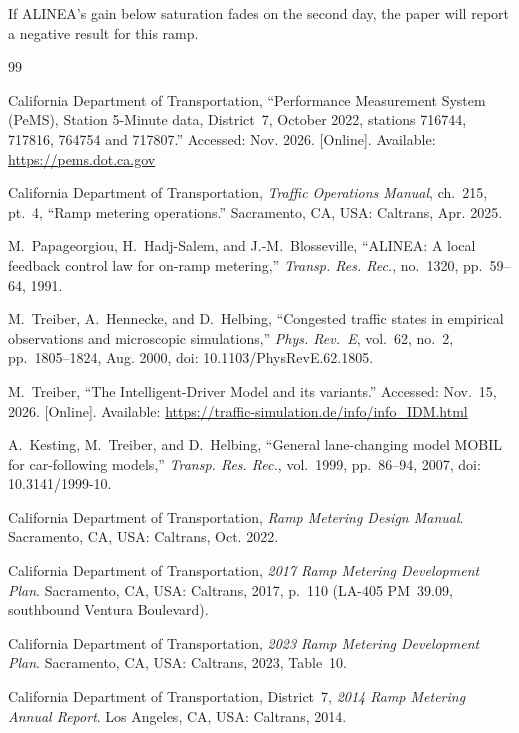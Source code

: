 \documentclass[11pt,letterpaper]{article}
\begin{document}
If ALINEA's gain below saturation fades on the second day, the paper will report a
negative result for this ramp.

\begin{thebibliography}{99}
\setlength{\itemsep}{2pt}

California Department of Transportation, ``Performance Measurement System (PeMS),
Station 5-Minute data, District~7, October 2022, stations 716744, 717816, 764754 and
717807.'' Accessed: Nov. 2026. [Online]. Available: \url{https://pems.dot.ca.gov}

California Department of Transportation, \emph{Traffic Operations Manual}, ch.~215,
pt.~4, ``Ramp metering operations.'' Sacramento, CA, USA: Caltrans, Apr. 2025.

M.~Papageorgiou, H.~Hadj-Salem, and J.-M.~Blosseville, ``ALINEA: A local feedback
control law for on-ramp metering,'' \emph{Transp. Res. Rec.}, no.~1320, pp.~59--64,
1991.

M.~Treiber, A.~Hennecke, and D.~Helbing, ``Congested traffic states in empirical
observations and microscopic simulations,'' \emph{Phys. Rev.~E}, vol.~62, no.~2,
pp.~1805--1824, Aug. 2000, doi: 10.1103/PhysRevE.62.1805.

M.~Treiber, ``The Intelligent-Driver Model and its variants.'' Accessed: Nov.~15, 2026.
[Online]. Available: \url{https://traffic-simulation.de/info/info_IDM.html}

A.~Kesting, M.~Treiber, and D.~Helbing, ``General lane-changing model MOBIL for
car-following models,'' \emph{Transp. Res. Rec.}, vol.~1999, pp.~86--94, 2007,
doi: 10.3141/1999-10.

California Department of Transportation, \emph{Ramp Metering Design Manual}.
Sacramento, CA, USA: Caltrans, Oct. 2022.

California Department of Transportation, \emph{2017 Ramp Metering Development Plan}.
Sacramento, CA, USA: Caltrans, 2017, p.~110 (LA-405 PM~39.09, southbound Ventura
Boulevard).

California Department of Transportation, \emph{2023 Ramp Metering Development Plan}.
Sacramento, CA, USA: Caltrans, 2023, Table~10.

California Department of Transportation, District~7, \emph{2014 Ramp Metering Annual
Report}. Los Angeles, CA, USA: Caltrans, 2014.


\end{thebibliography}
\end{document}

